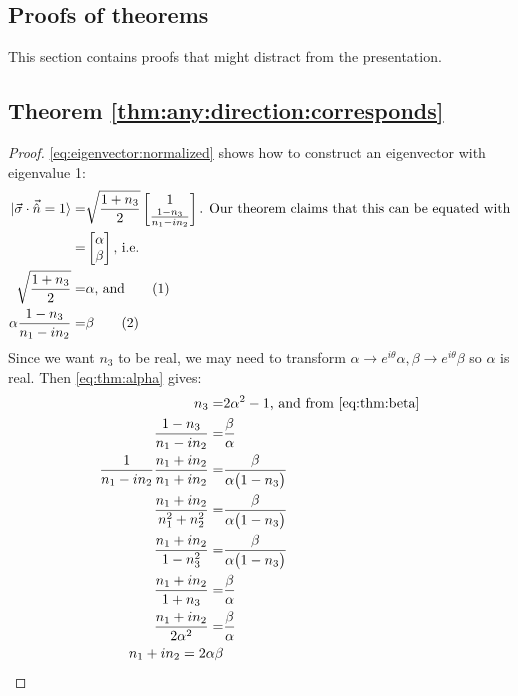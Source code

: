 \documentclass[]{article}
\newcommand\numberthis{\addtocounter{equation}{1}\tag{\theequation}}
\begin{document}
\begin{appendices}
	\section {Proofs of theorems}
	This section contains proofs that might distract from the presentation.
	\subsection{Theorem \ref{thm:any:direction:corresponds}}\label{proof:any:direction:corresponds}
	\begin{proof}
		\eqref{eq:eigenvector:normalized} shows how to construct an eigenvector with eigenvalue 1:
		\begin{align*}
		\ket{\vec{\sigma} \cdot \vec{\hat{n}}=1} =& \sqrt{\frac{1+n_3}{2}} \begin{bmatrix}
		1\\\frac{1-n_3}{n_1-i n_2}
		\end{bmatrix}\text{. Our theorem claims that this can be equated with} \\
		=& \begin{bmatrix}
		\alpha\\
		\beta
		\end{bmatrix} \text{, i.e.}\\
		\sqrt{\frac{1+n_3}{2}} =& \alpha \text{, and} \numberthis \label{eq:thm:alpha}\\
		\alpha \frac{1-n_3}{n_1-i n_2} =& \beta \numberthis \label{eq:thm:beta} 
		\end{align*}
		Since we want $n_3$ to be real, we may need to transform $\alpha \rightarrow e^{i\theta}\alpha, \beta \rightarrow e^{i\theta}\beta$ so $\alpha$ is real. Then \eqref{eq:thm:alpha} gives:
		\begin{align*}
		n_3 =& 2 \alpha^2-1 \text{, and from \eqref{eq:thm:beta}}\\
		\frac{1-n_3}{n_1-i n_2} =& \frac{\beta}{\alpha}\\
		\frac{1}{n_1-i n_2}\frac{{n_1+i n_2}}{{n_1+i n_2}}=&\frac{\beta}{\alpha\big(1-n_3\big)}\\
		\frac{{n_1+i n_2}}{{n_1^2+ n_2^2}} =& \frac{\beta}{\alpha\big(1-n_3\big)}\\
		\frac{{n_1+i n_2}}{{1- n_3^2}} =&\frac{\beta}{\alpha\big(1-n_3\big)}\\
		\frac{{n_1+i n_2}}{1+ n_3} =&\frac{\beta}{\alpha}\\
		\frac{{n_1+i n_2}}{2 \alpha^2} =&\frac{\beta}{\alpha}\\
		n_1+i n_2 = 2\alpha\beta
		\end{align*} 
	\end{proof}
\end{appendices}

\raggedright

\end{document}
